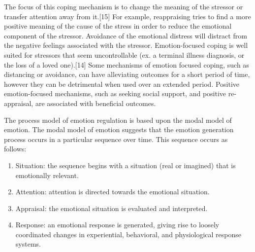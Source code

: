 \documentclass[11pt]{article}
\theoremstyle{remark}
\theoremstyle{definition}
\begin{document}
The focus of this coping mechanism is to change the meaning of the stressor or transfer attention away from it.[15] For example, reappraising tries to find a more positive meaning of the cause of the stress in order to reduce the emotional component of the stressor. Avoidance of the emotional distress will distract from the negative feelings associated with the stressor. Emotion-focused coping is well suited for stressors that seem uncontrollable (ex. a terminal illness diagnosis, or the loss of a loved one).[14] Some mechanisms of emotion focused coping, such as distancing or avoidance, can have alleviating outcomes for a short period of time, however they can be detrimental when used over an extended period. Positive emotion-focused mechanisms, such as seeking social support, and positive re-appraisal, are associated with beneficial outcomes.










The process model of emotion regulation is based upon the modal model of emotion. The modal model of emotion suggests that the emotion generation process occurs in a particular sequence over time. This sequence occurs as follows:

\begin{enumerate}
\item Situation: the sequence begins with a situation (real or imagined) that is emotionally relevant.

\item Attention: attention is directed towards the emotional situation.

\item Appraisal: the emotional situation is evaluated and interpreted.

\item Response: an emotional response is generated, giving rise to loosely coordinated changes in experiential, behavioral, and physiological response systems.
\end{enumerate}







\end{document}
